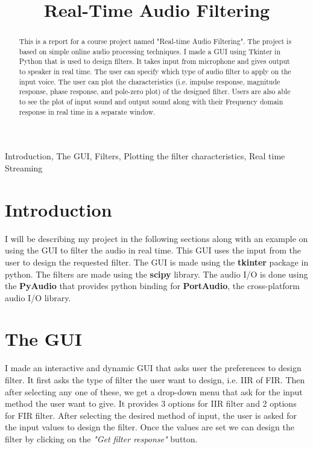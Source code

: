 \documentclass{article}
\title{Real-Time Audio Filtering}
\begin{document}
%
\maketitle
%
\begin{abstract}
This is a report for a course project named "Real-time Audio Filtering". The project is based on simple online audio processing techniques. I made a GUI using Tkinter in Python that is used to design filters. It takes input from microphone and gives output to speaker in real time. The user can specify which type of audio filter to apply on the input voice. The user can plot the characteristics (i.e. impulse response, magnitude response, phase response, and pole-zero plot) of the designed filter. Users are also able to see the plot of input sound and output sound along with their Frequency domain response in real time in a separate window.
\end{abstract}
%
\begin{keywords}
Introduction, The GUI, Filters, Plotting the filter characteristics, Real time Streaming
\end{keywords}
%
\section{Introduction}
\label{sec:intro}
I will be describing my project in the following sections along with an example on using the GUI to filter the audio in real time.
This GUI uses the input from the user to design the requested filter. The GUI is made using the {\bf tkinter} package in python. The filters are made using the {\bf scipy} library. The audio I/O is done using the {\bf PyAudio} that provides python binding for {\bf PortAudio}, the cross-platform audio I/O library.

\section{The GUI}
\label{sec:gui}

I made an interactive and dynamic GUI that asks user the preferences to design filter. It first asks the type of filter the user want to design, i.e. IIR of FIR. Then after selecting any one of these, we get a drop-down menu that ask for the input method the user want to give. It provides 3 options for IIR filter and 2 options for FIR filter. After selecting the desired method of input, the user is asked for the input values to design the filter. Once the values are set we can design the filter by clicking on the \emph{"Get filter response"} button.
\end{document}
